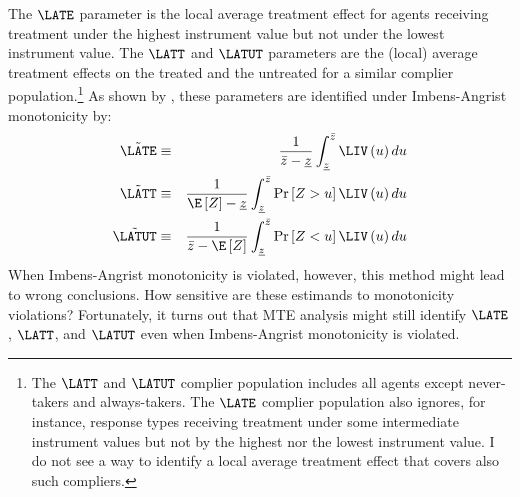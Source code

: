 The $\LATE$ parameter is the local average treatment effect for agents
receiving treatment under the highest instrument value but not under
the lowest instrument value. The $\LATT$ and $\LATUT$ parameters
are the (local) average treatment effects on the treated and the untreated
for a similar complier population.\footnote{The $\LATT$ and $\LATUT$ complier population includes all agents
except never-takers and always-takers. The $\LATE$ complier population
also ignores, for instance, response types receiving treatment under
some intermediate instrument values but not by the highest nor the
lowest instrument value. I do not see a way to identify a local average
treatment effect that covers also such compliers.} As shown by \citet{heckman1999local,heckman2005structural}, these
parameters are identified under Imbens-Angrist monotonicity by:
\begin{eqnarray*}
\tilde{\LATE} & \equiv & \frac{1}{\bar{z}-\underline{z}}\int_{\underline{z}}^{\bar{z}}\LIV\left(u\right)du\\
\tilde{\LATT} & \equiv & \frac{1}{\E\left[Z\right]-\underline{z}}\int_{\underline{z}}^{\bar{z}}\Pr\left[Z>u\right]\LIV\left(u\right)du\\
\tilde{\LATUT} & \equiv & \frac{1}{\bar{z}-\E\left[Z\right]}\int_{\underline{z}}^{\bar{z}}\Pr\left[Z<u\right]\LIV\left(u\right)du
\end{eqnarray*}
When Imbens-Angrist monotonicity is violated, however, this method
might lead to wrong conclusions. How sensitive are these estimands
to monotonicity violations? Fortunately, it turns out that MTE analysis
might still identify $\LATE$, $\LATT$, and $\LATUT$ even when Imbens-Angrist
monotonicity is violated. 

